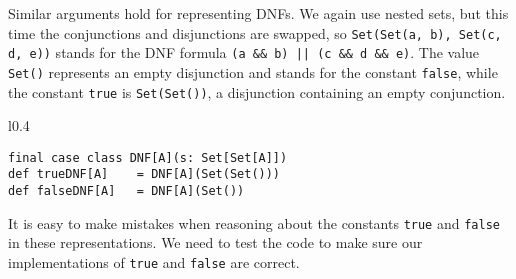 Similar arguments hold for representing DNFs. We again use nested
sets, but this time the conjunctions and disjunctions are swapped,
so \lstinline!Set(Set(a, b), Set(c, d, e))! stands for the  DNF formula
\lstinline!(a && b) || (c && d && e)!. The value \lstinline!Set()!
represents an empty disjunction and stands for the constant \lstinline!false!,
while the constant \lstinline!true! is \lstinline!Set(Set())!, a
disjunction containing an empty conjunction.

\begin{wrapfigure}{l}{0.4\columnwidth}%
\vspace{-0.6\baselineskip}
\begin{lstlisting}
final case class DNF[A](s: Set[Set[A]])
def trueDNF[A]    = DNF[A](Set(Set()))
def falseDNF[A]   = DNF[A](Set())
\end{lstlisting}
\vspace{-1\baselineskip}
\end{wrapfigure}%

\noindent It is easy to make mistakes when reasoning about the constants
\lstinline!true! and \lstinline!false! in these representations.
We need to test the code to make sure our implementations of \lstinline!true!
and \lstinline!false! are correct.

